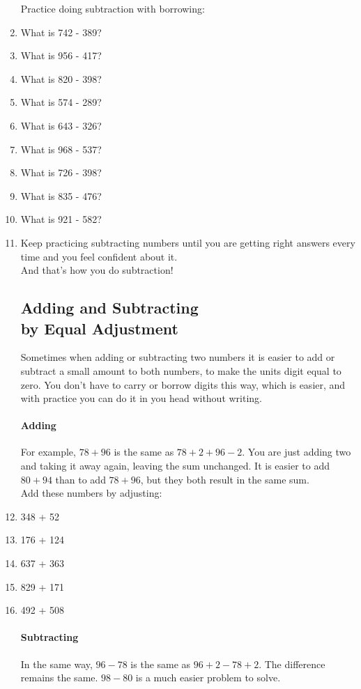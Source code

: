 \documentclass[12pt]{article}
\begin{document}
\begin{enumerate}
Practice doing subtraction with borrowing:
\item What is 742 - 389?
\item What is 956 - 417?
\item What is 820 - 398?
\item What is 574 - 289?
\item What is 643 - 326?
\item What is 968 - 537?
\item What is 726 - 398?
\item What is 835 - 476?
\item What is 921 - 582?\\

\item Keep practicing subtracting numbers until you are getting right answers every time and you feel confident about it.\\

And that's how you do subtraction!

\vspace{16pt}
\subsection*{Adding and Subtracting\\by Equal Adjustment}
Sometimes when adding or subtracting two numbers it is easier to add or subtract a small amount to both numbers, to make the units digit equal to zero. You don't have to carry or borrow digits this way, which is easier, and with practice you can do it in you head without writing.\\

\paragraph{Adding}
For example, $78 + 96$ is the same as $78 + 2 + 96 - 2$. You are just adding two and taking it away again, leaving the sum unchanged. It is easier to add $80 + 94$ than to add $78 + 96$, but they both result in the same sum.\\

Add these numbers by adjusting:
\item 348 + 52
\item 176 + 124
\item 637 + 363
\item 829 + 171
\item 492 + 508

\paragraph{Subtracting}
In the same way, $96 - 78$ is the same as $96 + 2 - 78 + 2$. The difference remains the same. $98 - 80$ is a much easier problem to solve.


\end{enumerate}
\end{document}
